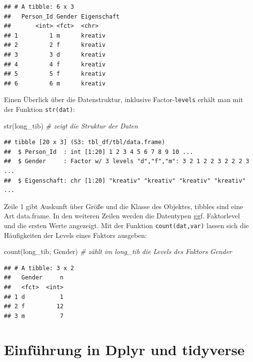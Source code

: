 \documentclass[
]{book}
\newenvironment{Shaded}{\begin{snugshade}}{\end{snugshade}}
\newcommand{\CommentTok}[1]{\textcolor[rgb]{0.56,0.35,0.01}{\textit{#1}}}
\newcommand{\FunctionTok}[1]{\textcolor[rgb]{0.00,0.00,0.00}{#1}}
\newcommand{\NormalTok}[1]{#1}
\theoremstyle{definition}
\theoremstyle{definition}
\theoremstyle{definition}
\theoremstyle{definition}
\theoremstyle{remark}
\begin{document}
\begin{verbatim}
## # A tibble: 6 x 3
##   Person_Id Gender Eigenschaft
##       <int> <fct>  <chr>      
## 1         1 m      kreativ    
## 2         2 f      kreativ    
## 3         3 d      kreativ    
## 4         4 f      kreativ    
## 5         5 f      kreativ    
## 6         6 m      kreativ
\end{verbatim}

Einen Überlick über die Datenstruktur, inklusive Factor-\texttt{levels} erhält man mit der Funktion \texttt{str(dat)}:

\begin{Shaded}
\begin{Highlighting}[]
\FunctionTok{str}\NormalTok{(long\_tib)      }\CommentTok{\# zeigt die Struktur der Daten}
\end{Highlighting}
\end{Shaded}

\begin{verbatim}
## tibble [20 x 3] (S3: tbl_df/tbl/data.frame)
##  $ Person_Id  : int [1:20] 1 2 3 4 5 6 7 8 9 10 ...
##  $ Gender     : Factor w/ 3 levels "d","f","m": 3 2 1 2 2 3 2 2 2 3 ...
##  $ Eigenschaft: chr [1:20] "kreativ" "kreativ" "kreativ" "kreativ" ...
\end{verbatim}

Zeile 1 gibt Auskunft über Größe und die Klasse des Objektes, tibbles sind eine Art data.frame. In den weiteren Zeilen werden die Datentypen ggf. Faktorlevel und die ersten Werte angezeigt. Mit der Funktion \texttt{count(dat,var)} lassen sich die Häufigkeiten der Levels eines Faktors ausgeben:

\begin{Shaded}
\begin{Highlighting}[]
\FunctionTok{count}\NormalTok{(long\_tib, Gender)     }\CommentTok{\# zählt im long\_tib die Levels des Faktors Gender}
\end{Highlighting}
\end{Shaded}

\begin{verbatim}
## # A tibble: 3 x 2
##   Gender     n
##   <fct>  <int>
## 1 d          1
## 2 f         12
## 3 m          7
\end{verbatim}

\hypertarget{einfuxfchrung-in-dplyr-und-tidyverse}{%
\section{Einführung in Dplyr und tidyverse}\label{einfuxfchrung-in-dplyr-und-tidyverse}}
\end{document}
